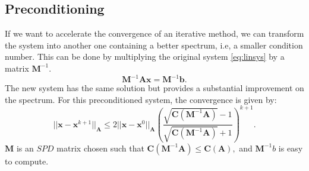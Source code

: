 \documentclass{ecmorXV}
\begin{document}
 \subsection{Preconditioning}
\hspace{0.5cm}If we want to accelerate the convergence of an iterative method, we can transform the system into
another one containing a better spectrum, i.e, a smaller condition number. 
This can be done by multiplying the original system \eqref{eq:linsys} by a matrix $\mathbf{M}^{-1}.$
\begin{equation}\label{eq:precon}
 \mathbf{M}^{-1}\mathbf{A}\mathbf{x}=\mathbf{M}^{-1}\mathbf{b}.
\end{equation}
The new system has the same solution but provides a substantial improvement on the spectrum. 
For this preconditioned system, the convergence is given by:
\begin{equation}\label{eq:convp}
 ||\mathbf{x}-\mathbf{x}^{k+1}||_\mathbf{A}\leq 2||\mathbf{x}-\mathbf{x}^{0}||_\mathbf{A} 
 \left( \frac{\sqrt{\mathbf{C}(\mathbf{M}^{-1}\mathbf{A})}-1}{\sqrt{\mathbf{C}(\mathbf{M}^{-1}\mathbf{A})}+1} \right)^{k+1}.
\end{equation}
$\mathbf{M}$ is an $SPD$ matrix chosen such that $\mathbf{C}(\mathbf{M}^{-1}\mathbf{A})\leq \mathbf{C}(\mathbf{A}),$ and $\mathbf{M}^{-1}b$ is easy to compute.
\end{document}
